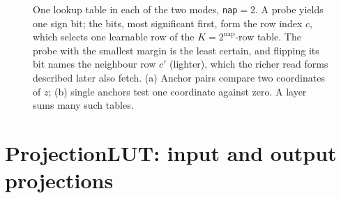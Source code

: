 \documentclass[11pt]{article}
\DeclareRobustCommand{\code}[1]{{\renewcommand{\_}{\textunderscore\allowbreak}\texttt{#1}}}
\begin{document}
\begin{figure}[t]
{}
\caption{One lookup table in each of the two modes, \code{nap}$=2$. A probe yields one sign bit; the
bits, most significant first, form the row index $c$, which selects one learnable row of the
$K=2^{\text{nap}}$-row table. The probe with the smallest margin is the least certain, and flipping its
bit names the neighbour row $c'$ (lighter), which the richer read forms described later also fetch. (a) Anchor
pairs compare two coordinates of $z$; (b) single anchors test one coordinate against zero. A layer sums
many such tables.}
\label{fig:table}
\end{figure}

\section{ProjectionLUT: input and output projections}
\label{sec:projection}
\end{document}
